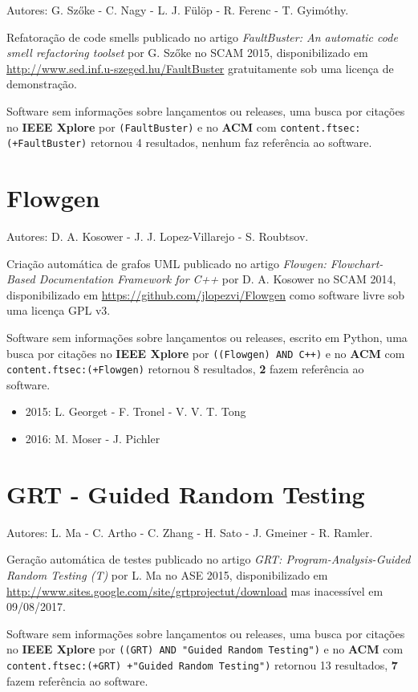 Autores:
G. Szőke - C. Nagy - L. J. Fülöp - R. Ferenc - T. Gyimóthy.

Refatoração de code smells
publicado no artigo {\it FaultBuster: An automatic code smell refactoring toolset}
por G. Szőke
no SCAM 2015,
disponibilizado em \url{http://www.sed.inf.u-szeged.hu/FaultBuster}
gratuitamente
sob uma licença de demonstração.

Software sem informações sobre lançamentos ou releases,
uma busca por citações no {\bf IEEE Xplore} por
\texttt{(FaultBuster)}
e no {\bf ACM} com
\texttt{content.ftsec:(+FaultBuster)}
retornou
4 resultados,
nenhum faz referência ao software.


\section{Flowgen}

Autores:
D. A. Kosower - J. J. Lopez-Villarejo - S. Roubtsov.

Criação automática de grafos UML
publicado no artigo {\it Flowgen: Flowchart-Based Documentation Framework for C++}
por D. A. Kosower
no SCAM 2014,
disponibilizado em \url{https://github.com/jlopezvi/Flowgen}
como software livre
sob uma licença GPL v3.

Software sem informações sobre lançamentos ou releases,
escrito em Python,
uma busca por citações no {\bf IEEE Xplore} por
\texttt{((Flowgen) AND C++)}
e no {\bf ACM} com
\texttt{content.ftsec:(+Flowgen)}
retornou
8 resultados,
{\bf 2} fazem referência ao software.

\begin{itemize}
\item 2015: L. Georget - F. Tronel - V. V. T. Tong
\item 2016: M. Moser - J. Pichler
\end{itemize}

\section{GRT - Guided Random Testing}

Autores:
L. Ma - C. Artho - C. Zhang - H. Sato - J. Gmeiner - R. Ramler.

Geração automática de testes
publicado no artigo {\it GRT: Program-Analysis-Guided Random Testing (T)}
por L. Ma
no ASE 2015,
disponibilizado em \url{http://www.sites.google.com/site/grtprojectut/download}
mas inacessível em 09/08/2017.

Software sem informações sobre lançamentos ou releases,
uma busca por citações no {\bf IEEE Xplore} por
\texttt{((GRT) AND "Guided Random Testing")}
e no {\bf ACM} com
\texttt{content.ftsec:(+GRT) +"Guided Random Testing")}
retornou
13 resultados,
{\bf 7} fazem referência ao software.

